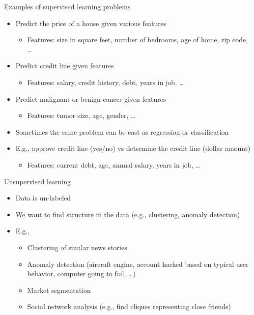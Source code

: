 \documentclass[aspectratio=169, xcolor=dvipsnames]{beamer}
\begin{document}
  \begin{frame}{Examples of supervised learning problems}
    \begin{itemize}
      \item Predict the price of a house given various features
        \begin{itemize}
          \item Features: size in square feet, number of bedrooms, age of home, zip
            code, \ldots{}
        \end{itemize}

      \item Predict credit line given features
        \begin{itemize}
          \item Features: salary, credit history, debt, years in job, \ldots{}
        \end{itemize}

      \item Predict malignant or benign cancer given features
        \begin{itemize}
          \item Features: tumor size, age, gender, \ldots{}
        \end{itemize}

      \item Sometimes the same problem can be cast as regression or classification

      \item E.g., approve credit line (yes/no) vs determine the credit line (dollar
        amount)
        \begin{itemize}
          \item Features: current debt, age, annual salary, years in job, \ldots{}
        \end{itemize}
    \end{itemize}
  \end{frame}

  \begin{frame}{Unsupervised learning}
  \begin{itemize}
  \item
    Data is un-labeled
  \item
    We want to find structure in the data (e.g., clustering, anomaly
    detection)
  \item
    E.g.,
    \begin{itemize}
    \item
      Clustering of similar news stories
    \item
      Anomaly detection (aircraft engine, account hacked based on typical
      user behavior, computer going to fail, \ldots)
    \item
      Market segmentation
    \item
      Social network analysis (e.g., find cliques representing close
      friends)
    \end{itemize}
  \end{itemize}
  \end{frame}
\end{document}
